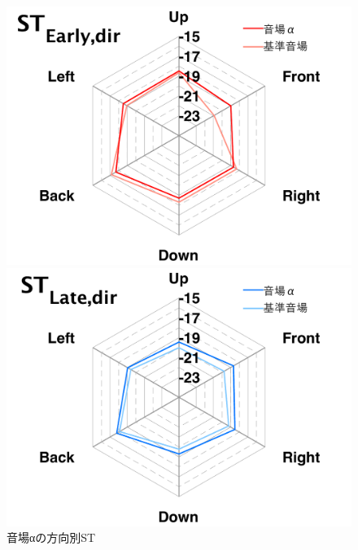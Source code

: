 \documentclass[11pt,a4j]{jreport}
\begin{document}

\begin{figure}[H]
  \begin{minipage}[b]{.5\linewidth}
    \centering
    \includegraphics[width=1\linewidth]{images/experimentField/withLegend/01alphaOnBaseEarly.pdf}
  \end{minipage}%
  \begin{minipage}[b]{.5\linewidth}
    \centering
    \includegraphics[width=1\linewidth]{images/experimentField/withLegend/05alphaOnBaseLate.pdf}
  \end{minipage}
  \caption{音場αの方向別ST}
  \label{fig:音場αの方向別ST}
\end{figure}
\end{document}
